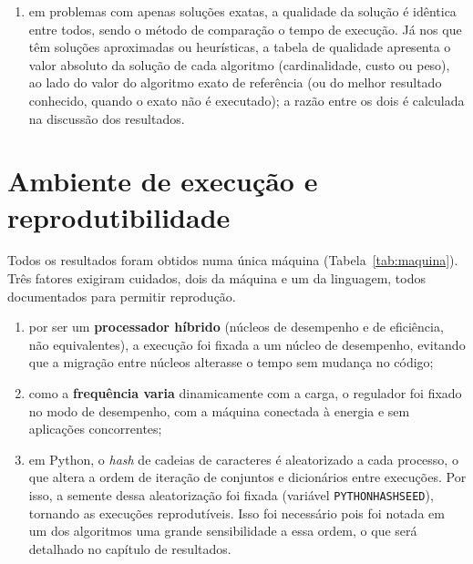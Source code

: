 \begin{enumerate}
    \item em problemas com apenas soluções exatas, a qualidade da solução é idêntica entre todos, sendo o método de comparação o tempo de execução. Já nos que têm soluções aproximadas ou heurísticas, a tabela de qualidade apresenta o valor absoluto da solução de cada algoritmo (cardinalidade, custo ou peso), ao lado do valor do algoritmo exato de referência (ou do melhor resultado conhecido, quando o exato não é executado); a razão entre os dois é calculada na discussão dos resultados.
\end{enumerate}

\section{Ambiente de execução e reprodutibilidade}
\label{sec:ambiente}

Todos os resultados foram obtidos numa única máquina
(Tabela~\ref{tab:maquina}). Três fatores exigiram cuidados, dois da máquina e um da linguagem,
todos documentados para permitir reprodução.

\begin{enumerate}
    \item por ser um \textbf{processador híbrido} (núcleos de desempenho e de eficiência, não equivalentes), a execução foi fixada a um núcleo de desempenho, evitando que a migração entre núcleos alterasse o tempo sem mudança no código;
    \item como a \textbf{frequência varia} dinamicamente com a carga, o regulador foi fixado no modo de desempenho, com a máquina conectada à energia e sem aplicações concorrentes;
    \item em Python, o \textit{hash} de cadeias de caracteres é aleatorizado a cada processo, o que altera a ordem de iteração de conjuntos e dicionários entre execuções. Por isso, a semente dessa aleatorização foi fixada (variável \texttt{PYTHONHASHSEED}), tornando as execuções reprodutíveis. Isso foi necessário pois foi notada em um dos algoritmos uma grande sensibilidade a essa ordem, o que será detalhado no capítulo de resultados.
\end{enumerate}

